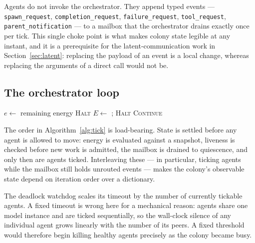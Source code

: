\documentclass[11pt]{article}
\begin{document}
Agents do not invoke the orchestrator. They append typed events ---
\texttt{spawn\_request}, \texttt{completion\_request}, \texttt{failure\_request},
\texttt{tool\_request}, \texttt{parent\_notification} --- to a mailbox that the
orchestrator drains exactly once per tick. This single choke point is what
makes colony state legible at any instant, and it is a prerequisite for the
latent-communication work in Section~\ref{sec:latent}: replacing the payload of
an event is a local change, whereas replacing the arguments of a direct call
would not be.

\subsection{The orchestrator loop}

\begin{algorithm}[t]
\caption{\textsc{Tick} --- one heartbeat of the colony}
\label{alg:tick}
\begin{algorithmic}[1]
\State $e \gets$ remaining energy
 \State \Return \textsc{Halt} 
 \State {} 
\EndIf
\State {} 
\State $E \gets$ ; 
\State {} 
\State {} 
 \State \Return \textsc{Halt} 
\EndIf
\State \Return \textsc{Continue}
\end{algorithmic}
\end{algorithm}

The order in Algorithm~\ref{alg:tick} is load-bearing. State is settled before
any agent is allowed to move: energy is evaluated against a snapshot, liveness
is checked before new work is admitted, the mailbox is drained to quiescence,
and only then are agents ticked. Interleaving these --- in particular, ticking
agents while the mailbox still holds unrouted events --- makes the colony's
observable state depend on iteration order over a dictionary.

The deadlock watchdog scales its timeout by the number of currently tickable
agents. A fixed timeout is wrong here for a mechanical reason: agents share one
model instance and are ticked sequentially, so the wall-clock silence of any
individual agent grows linearly with the number of its peers. A fixed threshold
would therefore begin killing healthy agents precisely as the colony became
busy.
\end{document}
